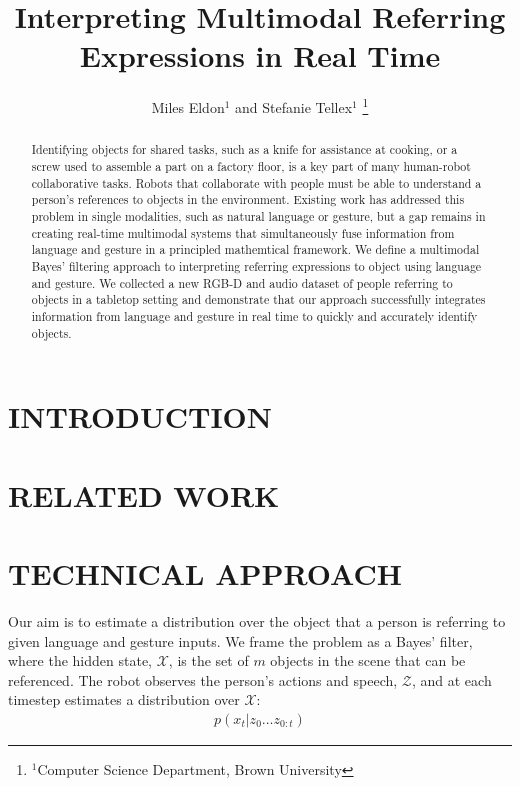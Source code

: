 \documentclass[letterpaper, 10 pt, conference]{ieeeconf}
\title{\LARGE \bf
Interpreting Multimodal Referring Expressions in Real Time}
\author{Miles Eldon$^{1}$ and Stefanie Tellex$^{1}$
\thanks{$^{1}$Computer Science Department, Brown University}
}
\begin{document}
\maketitle
\thispagestyle{empty}
\pagestyle{empty}

\begin{abstract}
Identifying objects for shared tasks, such as a knife for assistance
at cooking, or a screw used to assemble a part on a factory floor, is
a key part of many human-robot collaborative tasks.  Robots that
collaborate with people must be able to understand a person's
references to objects in the environment.  Existing work has addressed
this problem in single modalities, such as natural language or
gesture, but a gap remains in creating real-time multimodal systems
that simultaneously fuse information from language and gesture in a
principled mathemtical framework.  We define a multimodal Bayes'
filtering approach to interpreting referring expressions to object
using language and gesture.  We collected a new RGB-D and audio
dataset of people referring to objects in a tabletop setting and
demonstrate that our approach successfully integrates information from
language and gesture in real time to quickly and accurately identify
objects.
\end{abstract}

\section{INTRODUCTION}

\section{RELATED WORK}


\citep{matuszek12}

\section{TECHNICAL APPROACH}
Our aim is to estimate a distribution over the object that a person is
referring to given language and gesture inputs.  We frame the problem
as a Bayes' filter, where the hidden state, $\mathcal{X}$, is the set
of $m$ objects in the scene that can be referenced. The robot observes the person's actions and
speech, $\mathcal{Z}$, and at each timestep estimates a distribution
over $\mathcal{X}$:
\begin{align}
  p(x_t | z_0 \dots z_{0:t})
\end{align}
\end{document}
